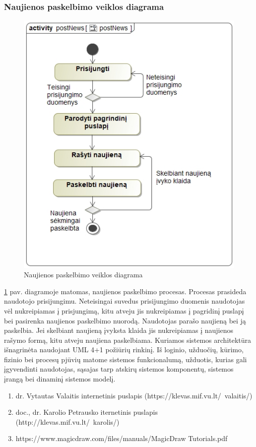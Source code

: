 \documentclass{VUMIFPSkursinis}
\begin{document}
\subsubsection{Naujienos paskelbimo veiklos diagrama}
\begin{figure}[H]
	\centering
	\includegraphics[scale=0.65]{img/postNews.jpg}
	\caption{Naujienos paskelbimo veiklos diagrama}
	\label{fig:postNews}
\end{figure}
\ref{fig:postNews} pav. diagramoje matomas, naujienos paskelbimo procesas. Procesas prasideda naudotojo prisijungimu. Neteisingai suvedus prisijungimo duomenis naudotojas vėl nukreipiamas į prisjungimą, kitu atveju jis nukreipiamas į pagridinį puslapį bei pasirenka naujienos paskelbimo nuorodą. Naudotojas parašo naujieną bei ją paskelbia. Jei skelbiant naujieną įvyksta klaida jis nukreipiamas į naujienos rašymo formą, kitu atveju naujiena paskelbiama.
\newpage
{}
Kuriamos sistemos architektūra išnagrinėta naudojant UML 4+1 požiūrių rinkinį. Iš loginio, užduočių, kūrimo, fizinio bei procesų pjūvių matome sistemos funkcionalumą, užduotis, kurias gali
įgyvendinti naudotojas, sąsajas tarp atskirų sistemos komponentų, sistemos įrangą bei dinaminį sistemos modelį.
\newpage
{}
\begin{enumerate}
\item dr. Vytautas Valaitis internetinis puslapis (https://klevas.mif.vu.lt/~valaitis/) 
\item doc., dr. Karolio Petrausko iternetinis puslapis (http://klevas.mif.vu.lt/~karolis/) 
\item https://www.magicdraw.com/files/manuals/MagicDraw Tutorials.pdf
\end{enumerate}
\end{document}
